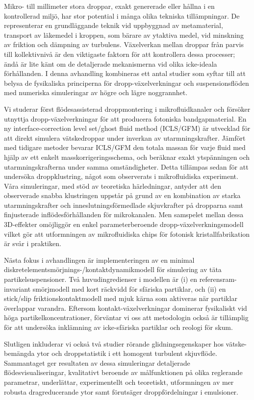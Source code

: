 \begin{abstrakt}
Mikro- till millimeter stora droppar, exakt genererade eller hållna i en kontrollerad miljö, har stor potential i många olika tekniska tillämpningar. De representerar en grundläggande teknik vid uppbyggnad av metamaterial, transport av läkemedel i kroppen, som bärare av ytaktiva medel, vid minskning av friktion och dämpning av turbulens. Växelverkan mellan droppar från parvis till kollektivnivå är den viktigaste faktorn för att kontrollera dessa processer; ändå är lite känt om de detaljerade mekanismerna vid olika icke-ideala förhållanden. I denna avhandling kombineras ett antal studier som syftar till att belysa de fysikaliska principerna för dropp-växelverkningar och suspensionsflöden med numeriska simuleringar av högre och lägre noggrannhet.

Vi studerar först flödesassisterad droppmontering i mikrofluidkanaler och försöker utnyttja dropp-växelverkningar för att producera fotoniska bandgapmaterial. En ny interface-correction level set/ghost fluid method (ICLS/GFM) är utvecklad för att direkt simulera vätskedroppar under inverkan av utarmningskrafter. Jämfört med tidigare metoder bevarar ICLS/GFM den totala massan för varje fluid med hjälp av ett enkelt masskorrigeringsschema, och beräknar exakt ytspänningen och utarmningskrafterna under samma omständigheter. Detta tillämpas sedan för att undersöka droppklustring, något som observerats i mikrofluidiska experiment. Våra simuleringar, med stöd av teoretiska härledningar, antyder att den observerade snabba klustringen uppstår på grund av en kombination av starka utarmningskrafter och inneslutningsförmedlade skjuvkrafter på dropparna samt finjusterade inflödesförhållanden för mikrokanalen. Men samspelet mellan dessa 3D-effekter omöjliggör en enkel parameterberoende dropp-växelverkningsmodell vilket gör att utformningen av mikrofluidiska chips för fotonisk kristallfabrikation är svår i praktiken.

Nästa fokus i avhandlingen är implementeringen av en minimal diskretelementsmörjnings-/kontaktdynamikmodell för simulering av täta partikelsuspensioner. Två huvudingredienser i modellen är (i) en referensram-invariant smörjmodell med kort räckvidd för sfäriska partiklar, och (ii) en stick/slip friktionskontaktmodell med mjuk kärna som aktiveras när partiklar överlappar varandra. Eftersom kontakt-växelverkningar dominerar fysikaliskt vid höga partikelkoncentrationer, förväntar vi oss att metodologin också är tillämplig för att undersöka inklämning av icke-sfäriska partiklar och reologi för skum.

Slutligen inkluderar vi också två studier rörande glidningsegenskaper hos vätske-bemängda ytor och droppstatistik i ett homogent turbulent skjuvflöde. Sammantaget ger resultaten av dessa simuleringar detaljerade flödesvisualiseringar, kvalitativt beroende av målfunktionen på olika reglerande parametrar,
underlättar, experimentellt och teoretiskt, utformningen av mer robusta dragreducerande ytor samt förutsäger droppfördelningar i emulsioner.

%
%
\end{abstrakt}



